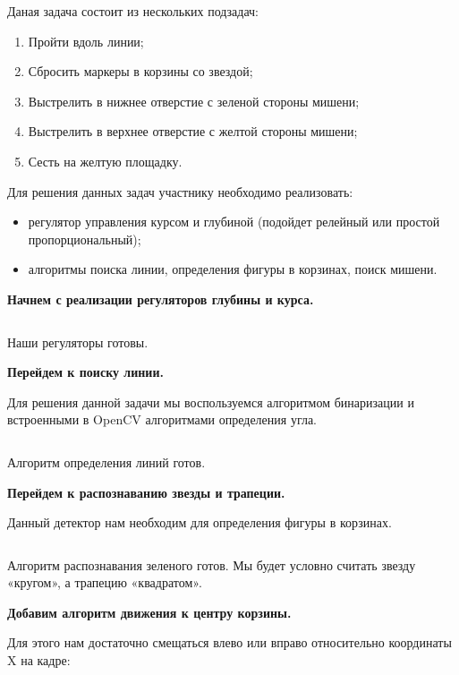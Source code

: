 \solutionSection

Даная задача состоит из нескольких подзадач:

\begin{enumerate}
    \item Пройти вдоль линии;
    \item Сбросить маркеры в корзины со звездой;
    \item Выстрелить в нижнее отверстие с зеленой стороны мишени;
    \item Выстрелить в верхнее отверстие с желтой стороны мишени;
    \item Сесть на желтую площадку.
\end{enumerate}

Для решения данных задач участнику необходимо реализовать:

\begin{itemize}
    \item регулятор управления курсом и глубиной (подойдет релейный или простой пропорциональный);
    \item алгоритмы поиска линии, определения фигуры в корзинах, поиск мишени.
\end{itemize}

\textbf{Начнем с реализации регуляторов глубины и курса.}

\inputminted[fontsize=\footnotesize, linenos]{cpp}{final/command_tour/vrs/task_02/source_1.cpp}

Наши регуляторы готовы. 

\textbf{Перейдем к поиску линии.} 

Для решения данной задачи мы воспользуемся алгоритмом бинаризации и встроенными в OpenCV алгоритмами определения угла. 

\inputminted[fontsize=\footnotesize, linenos]{cpp}{final/command_tour/vrs/task_02/source_2.cpp}

Алгоритм определения линий готов. 

\textbf{Перейдем к распознаванию звезды и трапеции.}

Данный детектор нам необходим для определения фигуры в корзинах. 

\inputminted[fontsize=\footnotesize, linenos]{cpp}{final/command_tour/vrs/task_02/source_3.cpp}

Алгоритм распознавания зеленого готов. Мы будет условно считать звезду «кругом», а трапецию «квадратом».  

\textbf{Добавим алгоритм движения к центру корзины.}

Для этого нам достаточно смещаться влево или вправо относительно координаты X на кадре: 


